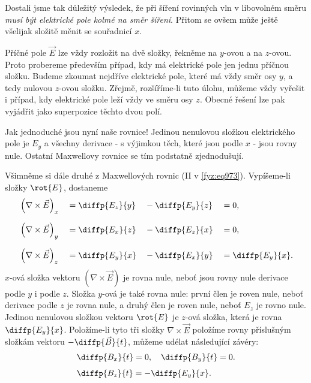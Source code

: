     Dostali jsme tak důležitý výsledek, že při šíření rovinných vln v libovolném směru \emph{musí
    být elektrické pole kolmé na směr šíření}. Přitom se ovšem může ještě všelijak složitě měnit se
    souřadnicí \(x\).
    
    Příčné pole \(\vec{E}\) lze vždy rozložit na dvě složky, řekněme na \(y\)-ovou a na \(z\)-ovou.
    Proto probereme především případ, kdy má elektrické pole jen jednu příčnou složku. Budeme
    zkoumat nejdříve elektrické pole, které má vždy směr osy \(y\), a tedy nulovou \(z\)-ovou
    složku. Zřejmě, rozšíříme-li tuto úlohu, můžeme vždy vyřešit i případ, kdy elektrické pole leží
    vždy ve směru osy \(z\). Obecné řešení lze pak vyjádřit jako superpozice těchto dvou polí.
    
    Jak jednoduché jsou nyní naše rovnice! Jedinou nenulovou složkou elektrického pole je \(E_y\) a
    všechny derivace - s výjimkou těch, které jsou podle \(x\) - jsou rovny nule. Ostatní Maxwellovy
    rovnice se tím podstatně zjednodušují.
    
    Všimněme si dále druhé z Maxwellových rovnic (II v \eqref{fyz:eq973}). Vypíšeme-li složky
    \(\rot{E}\), dostaneme
    \begin{alignat*}{4}
      &\left(\nabla\times\vec{E}\right)_x&&=\diffp{E_z}{y}&&-\diffp{E_y}{z}&&=0,\\[1.5ex]
      &\left(\nabla\times\vec{E}\right)_y&&=\diffp{E_x}{z}&&-\diffp{E_z}{x}&&=0,\\[1.5ex]
      &\left(\nabla\times\vec{E}\right)_z&&=\diffp{E_y}{x}&&-\diffp{E_x}{y}&&=\diffp{E_y}{x}.
    \end{alignat*}
    \(x\)-ová složka vektoru \(\left(\nabla\times\vec{E}\right)\) je rovna nule, neboť jsou rovny
    nule derivace podle \(y\) i podle \(z\). Složka \(y\)-ová je také rovna nule: první člen je
    roven nule, neboť derivace podle \(z\) je rovna nule, a druhý člen je roven nule, neboť \(E_z\)
    je rovno nule. Jedinou nenulovou složkou vektoru \(\rot{E}\) je \(z\)-ová složka, která je rovna
    \(\diffp{E_y}{x}\). Položíme-li tyto tři složky \(\nabla\times\vec{E}\) položíme rovny
    příslušným složkám vektoru \(-\diffp{\vec{B}}{t}\), můžeme udélat následující závéry:
    \begin{subequations}\label{fyz:eq977} 
      \begin{align}
        &\diffp{B_x}{t}=0,\quad\diffp{B_y}{t}=0. \label{fyz:eq977a} \\[1ex]
        &\diffp{B_z}{t}=-      \diffp{E_y}{x}.   \label{fyz:eq977b} 
      \end{align}     
    \end{subequations}

